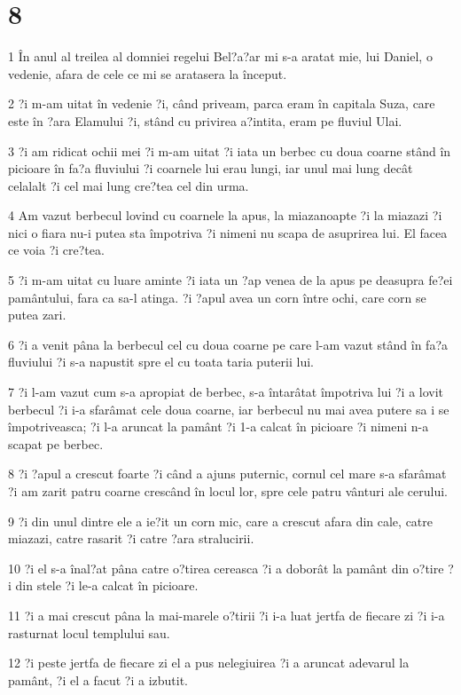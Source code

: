 \chapter{8}

\par 1 În anul al treilea al domniei regelui Bel?a?ar mi s-a aratat mie, lui Daniel, o vedenie, afara de cele ce mi se aratasera la început.
\par 2 ?i m-am uitat în vedenie ?i, când priveam, parca eram în capitala Suza, care este în ?ara Elamului ?i, stând cu privirea a?intita, eram pe fluviul Ulai.
\par 3 ?i am ridicat ochii mei ?i m-am uitat ?i iata un berbec cu doua coarne stând în picioare în fa?a fluviului ?i coarnele lui erau lungi, iar unul mai lung decât celalalt ?i cel mai lung cre?tea cel din urma.
\par 4 Am vazut berbecul lovind cu coarnele la apus, la miazanoapte ?i la miazazi ?i nici o fiara nu-i putea sta împotriva ?i nimeni nu scapa de asuprirea lui. El facea ce voia ?i cre?tea.
\par 5 ?i m-am uitat cu luare aminte ?i iata un ?ap venea de la apus pe deasupra fe?ei pamântului, fara ca sa-l atinga. ?i ?apul avea un corn între ochi, care corn se putea zari.
\par 6 ?i a venit pâna la berbecul cel cu doua coarne pe care l-am vazut stând în fa?a fluviului ?i s-a napustit spre el cu toata taria puterii lui.
\par 7 ?i l-am vazut cum s-a apropiat de berbec, s-a întarâtat împotriva lui ?i a lovit berbecul ?i i-a sfarâmat cele doua coarne, iar berbecul nu mai avea putere sa i se împotriveasca; ?i l-a aruncat la pamânt ?i 1-a calcat în picioare ?i nimeni n-a scapat pe berbec.
\par 8 ?i ?apul a crescut foarte ?i când a ajuns puternic, cornul cel mare s-a sfarâmat ?i am zarit patru coarne crescând în locul lor, spre cele patru vânturi ale cerului.
\par 9 ?i din unul dintre ele a ie?it un corn mic, care a crescut afara din cale, catre miazazi, catre rasarit ?i catre ?ara stralucirii.
\par 10 ?i el s-a înal?at pâna catre o?tirea cereasca ?i a doborât la pamânt din o?tire ?i din stele ?i le-a calcat în picioare.
\par 11 ?i a mai crescut pâna la mai-marele o?tirii ?i i-a luat jertfa de fiecare zi ?i i-a rasturnat locul templului sau.
\par 12 ?i peste jertfa de fiecare zi el a pus nelegiuirea ?i a aruncat adevarul la pamânt, ?i el a facut ?i a izbutit.

